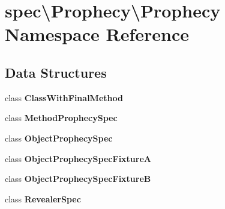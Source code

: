 \section{spec\textbackslash{}Prophecy\textbackslash{}Prophecy Namespace Reference}
\label{namespacespec_1_1_prophecy_1_1_prophecy}
\subsection*{Data Structures}
\begin{DoxyCompactItemize}
\item 
class {\bf Class\+With\+Final\+Method}
\item 
class {\bf Method\+Prophecy\+Spec}
\item 
class {\bf Object\+Prophecy\+Spec}
\item 
class {\bf Object\+Prophecy\+Spec\+Fixture\+A}
\item 
class {\bf Object\+Prophecy\+Spec\+Fixture\+B}
\item 
class {\bf Revealer\+Spec}
\end{DoxyCompactItemize}
